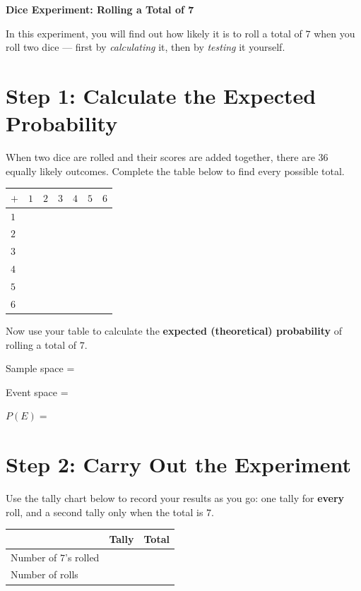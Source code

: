 \documentclass[11pt]{article}
\newcommand{\answork}{%
  \par\vspace{0.3em}
  \noindent Sample space = \hrulefill\par\vspace{0.4em}
  \noindent Event space = \hrulefill\par\vspace{0.4em}
  \noindent $P(E) = $\hrulefill\par\vspace{0.3em}
}
\begin{document}
\thispagestyle{firstpage}

\begin{center}
  {\Large\bfseries Dice Experiment: Rolling a Total of 7}
\end{center}
\vspace{0.3em}
\noindent In this experiment, you will find out how likely it is to roll a total of $7$ when
you roll two dice --- first by \emph{calculating} it, then by \emph{testing} it yourself.

\section{Step 1: Calculate the Expected Probability}
\noindent When two dice are rolled and their scores are added together, there are $36$ equally
likely outcomes. Complete the table below to find every possible total.

\vspace{0.3em}
\begin{center}
\begin{tabular}{|Z|Z|Z|Z|Z|Z|Z|}
\hline
$+$ & $1$ & $2$ & $3$ & $4$ & $5$ & $6$ \\\hline
$1$ & \rule{0pt}{0.8cm} & & & & & \\\hline
$2$ & \rule{0pt}{0.8cm} & & & & & \\\hline
$3$ & \rule{0pt}{0.8cm} & & & & & \\\hline
$4$ & \rule{0pt}{0.8cm} & & & & & \\\hline
$5$ & \rule{0pt}{0.8cm} & & & & & \\\hline
$6$ & \rule{0pt}{0.8cm} & & & & & \\\hline
\end{tabular}
\end{center}

\vspace{0.4em}
\noindent Now use your table to calculate the \textbf{expected (theoretical) probability} of
rolling a total of $7$.
\answork

\section{Step 2: Carry Out the Experiment}
\noindent Use the tally chart below to record your results as you go: one tally for
\textbf{every} roll, and a second tally only when the total is $7$.

\vspace{0.3em}
\begin{center}
\begin{tabular}{|p{4.3cm}|p{8.8cm}|p{1.6cm}|}
\hline
\textbf{} & \textbf{Tally} & \textbf{Total} \\\hline
Number of $7$'s rolled & \rule{0pt}{1.6cm} & \\\hline
Number of rolls & \rule{0pt}{1.6cm} & \\\hline
\end{tabular}
\end{center}
\end{document}
